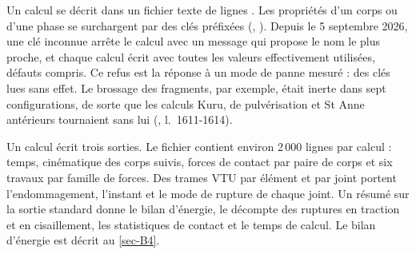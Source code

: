 Un calcul se décrit dans un fichier texte  de lignes . Les propriétés d'un corps ou d'une phase se surchargent par des clés préfixées (, ). Depuis le 5 septembre 2026, une clé inconnue arrête le calcul avec un message qui propose le nom le plus proche, et chaque calcul écrit  avec toutes les valeurs effectivement utilisées, défauts compris. Ce refus est la réponse à un mode de panne mesuré : des clés lues sans effet. Le brossage des fragments, par exemple, était inerte dans sept configurations, de sorte que les calculs Kuru, de pulvérisation et St Anne antérieurs tournaient sans lui (, l.~1611-1614).

Un calcul écrit trois sorties. Le fichier  contient environ 2\,000 lignes par calcul : temps, cinématique des corps suivis, forces de contact par paire de corps et six travaux par famille de forces. Des trames VTU par élément et par joint portent l'endommagement, l'instant et le mode de rupture de chaque joint. Un résumé sur la sortie standard donne le bilan d'énergie, le décompte des ruptures en traction et en cisaillement, les statistiques de contact et le temps de calcul. Le bilan d'énergie est décrit au \cref{sec-B4}.
